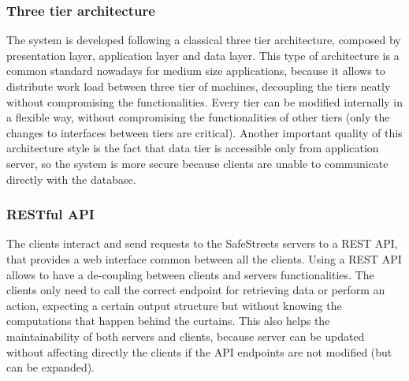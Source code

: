 \subsubsection{Three tier architecture}
The system is developed following a classical three tier architecture, composed by presentation layer, application layer and data layer. This type of architecture is a common standard nowadays for medium size applications, because it allows to distribute work load between three tier of machines, decoupling the tiers neatly without compromising the functionalities. Every tier can be modified internally in a flexible way, without compromising the functionalities of other tiers (only the changes to interfaces between tiers are critical). Another important quality of this architecture style is the fact that data tier is accessible only from application server, so the system is more secure because clients are unable to communicate directly with the database.

\subsubsection{RESTful API}

The clients interact and send requests to the SafeStreets servers to a REST API, that provides a web interface common between all the clients. Using a REST API allows to have a de-coupling between clients and servers functionalities. The clients only need to call the correct endpoint for retrieving data or perform an action, expecting a certain output structure but without knowing the computations that happen behind the curtains. This also helps the maintainability of both servers and clients, because server can be updated without affecting directly the clients if the API endpoints are not modified (but can be expanded).

